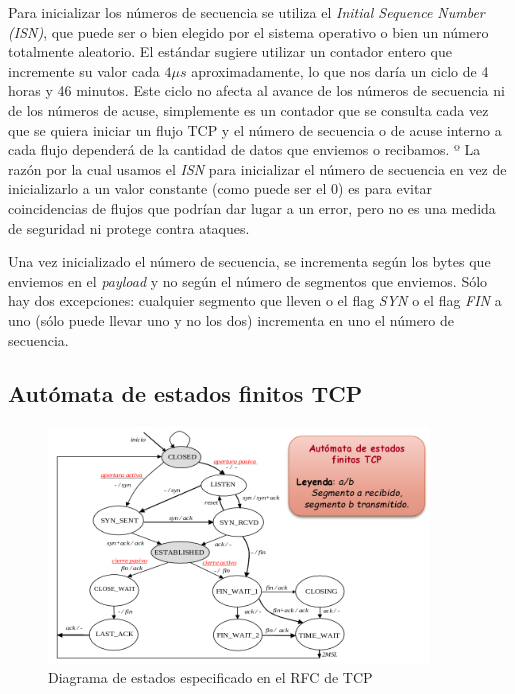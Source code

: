 \documentclass[10pt,a4paper,spanish]{report}
\begin{document}
Para inicializar los números de secuencia se utiliza el \textit{\textcolor{tema3}{Initial Sequence Number (ISN)}}, que puede ser o bien elegido por el sistema operativo o bien un número totalmente aleatorio. El estándar sugiere utilizar un contador entero que incremente su valor cada $4 \mu s$ aproximadamente, lo que nos daría un ciclo de 4 horas y 46 minutos. Este ciclo no afecta al avance de los números de secuencia ni de los números de acuse, simplemente es un contador que se consulta cada vez que se quiera iniciar un flujo TCP y el número de secuencia o de acuse interno a cada flujo dependerá de la cantidad de datos que enviemos o recibamos. 
º
La razón por la cual usamos el \textit{\textcolor{tema3}{ISN}} para inicializar el número de secuencia en vez de inicializarlo a un valor constante (como puede ser el 0) es para evitar coincidencias de flujos que podrían dar lugar a un error, pero no es una medida de seguridad ni protege contra ataques.

Una vez inicializado el número de secuencia, se incrementa según los bytes que enviemos en el \textit{\textcolor{tema3}{payload}} y no según el número de segmentos que enviemos. Sólo hay dos excepciones: cualquier segmento que lleven o el flag \textit{\textcolor{tema3}{SYN}} o el flag \textit{\textcolor{tema3}{FIN}} a uno (sólo puede llevar uno y no los dos) incrementa en uno el número de secuencia.

\subsection{\textcolor{tema3}Autómata de estados finitos TCP}
\begin{figure}[!h]
  \centering
  \includegraphics[width=0.9\textwidth]{diagramaTCP}
  \caption{Diagrama de estados especificado en el RFC de TCP}
  \label{automatatcp}
\end{figure}
\end{document}
